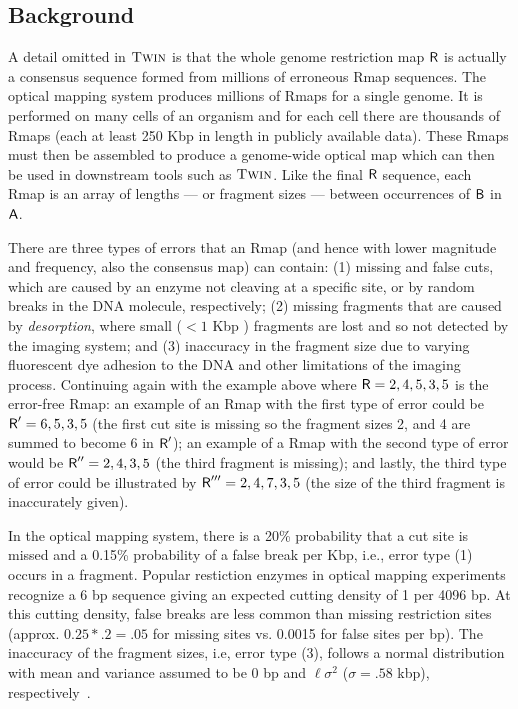 \subsection{Background}
\label{sec-background-koh}










A detail omitted in $\mbox{\rm \textsc{Twin}}$ is that the whole genome restriction map $\mbox{\rm {\sf R}}$ is actually a consensus sequence formed from millions of erroneous Rmap sequences.
The optical mapping system produces millions of Rmaps for a single genome. It is performed on many cells of an organism and for each cell there are thousands of Rmaps (each at least 250 Kbp in length in publicly available data).
These Rmaps must then be assembled to produce a genome-wide optical map which can then be used in downstream tools such as $\mbox{\rm \textsc{Twin}}$.
Like the final $\mbox{\rm {\sf R}}$ sequence, each Rmap is an array of lengths --- or fragment sizes --- between occurrences of $\mathsf{B}$ in $\mathsf{A}$.


There are three types of errors that an Rmap (and hence with lower magnitude and frequency, also the consensus map) can contain: (1) missing and false cuts, which are caused by an enzyme not cleaving at a specific site, or by random breaks in the DNA molecule, respectively; (2) missing fragments that are caused by {\em desorption}, where small ($ < 1$ Kbp ) fragments are lost and so not detected by the imaging system; and (3) inaccuracy in the fragment size due to varying fluorescent dye adhesion to the DNA and other limitations of the imaging process.  Continuing again with the example above where $\mbox{\rm {\sf R}} = 2,4,5,3,5$ is the error-free Rmap: an example of an Rmap with the first type of error could be $\mbox{\rm {\sf R}}' = 6,5,3,5$ (the first cut site is missing so the fragment sizes 2, and 4 are summed to become 6 in $\mbox{\rm {\sf R}}'$); an example of a Rmap with the second type of error would be $\mbox{\rm {\sf R}}'' = 2,4,3,5$ (the third fragment is missing); and lastly, the third type of error could be illustrated by $\mbox{\rm {\sf R}}''' = 2,4,7,3,5$ (the size of the third fragment is inaccurately given).


 In the optical mapping system, there is a 20\% probability that a cut site is missed and a 0.15\% probability of a false break per Kbp, i.e., error type (1) occurs in a fragment.  Popular restiction enzymes in optical mapping experiments recognize a 6 bp sequence giving an expected cutting density of 1 per 4096 bp.  At this cutting density, false breaks are less common than missing restriction sites (approx. $0.25 * .2 = .05$ for missing sites vs. 0.0015 for false sites per bp).  The inaccuracy of the fragment sizes, i.e, error type (3), follows a normal distribution with mean and variance assumed to be 0 bp and $\ell \sigma^2$ ($\sigma = .58$ kbp), respectively~\cite{Valouev06}.







